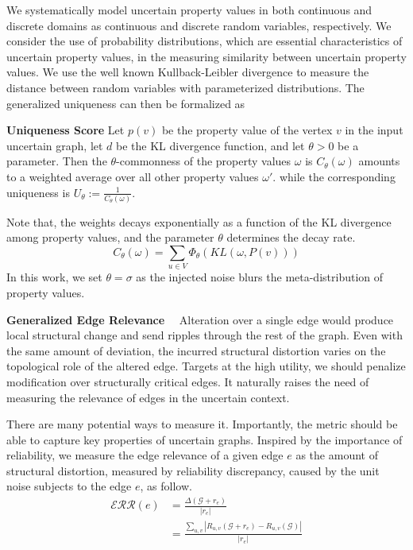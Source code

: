 We systematically model uncertain property values in both continuous and discrete domains as continuous and discrete random variables, respectively.
We consider the use of probability distributions, which are essential characteristics of uncertain property values, in the measuring similarity between uncertain property values. 
We use the well known Kullback-Leibler divergence to measure the distance between random variables with parameterized distributions. 
The generalized uniqueness can then be formalized as
\begin{definition}
    \textbf{Uniqueness Score}
     Let $\mathit{p}(v)$ be the property value of the vertex $v$ in the input uncertain graph, 
     let $d$ be the KL divergence function, and let $\theta >0$  be a parameter. 
       Then the $\theta$-commonness of the property values $\omega$
       is $C_{\theta}(\omega)$ amounts to a weighted average over all other property values $\omega'$.    
     while the corresponding uniqueness is $U_{\theta}:= \frac{1}{C_{\theta}(\omega)}$. 
\end{definition} 
Note that, the weights decays exponentially as a function of the KL divergence among property values, 
and the parameter $\theta$ determines the decay rate. 
\begin{equation*}
  C_{\theta}(\omega) = \sum_{u \in V} \Phi_{\theta}(KL(\omega, P(v)))
\end{equation*}
In this work, we set $\theta=\sigma$ as the injected noise blurs the meta-distribution of property values. 
 
\textbf{Generalized Edge Relevance}~~
Alteration over a single edge would produce local structural change and send ripples through the rest of the graph. 
Even with the same amount of deviation, the incurred structural distortion varies on the topological role of the altered edge. 
Targets at the high utility, we should penalize modification over structurally critical edges.  
It naturally raises the need of measuring the relevance of edges in the uncertain context. 

There are many potential ways to measure it. 
Importantly, the metric should be able to capture key properties of uncertain graphs.
Inspired by the importance of reliability, we measure the edge relevance of a given edge $e$ as the amount of structural distortion, measured by reliability discrepancy, caused by the unit noise subjects to the edge $e$, as follow. 
\begin{equation*}
  \begin{split}
    \mathcal{ERR}({e}) &= \frac{\Delta(\mathcal{G}+r_{e})}{|r_{e}|}  \\
                       &= \frac{\sum_{u,v} |R_{u,v}(\mathcal{G}+r_{e}) -R_{u,v}(\mathcal{G})|} {|r_{e}|}
  \end{split}
\end{equation*}

